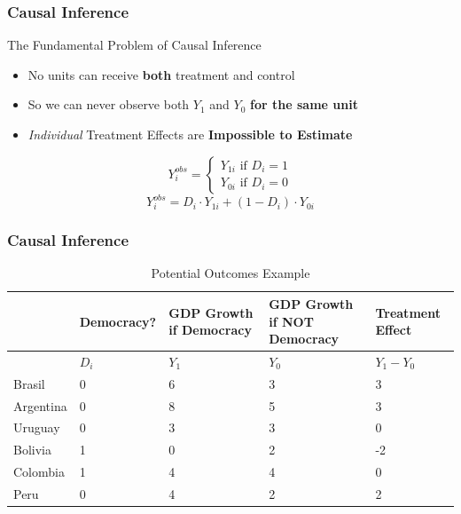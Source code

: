 \documentclass[xcolor=x11names,compress]{beamer}\usepackage[]{graphicx}\usepackage[]{color}
\renewcommand{\(}{\begin{columns}}
\renewcommand{\)}{\end{columns}}
\newcommand{\<}[1]{\begin{column}{#1}}
\renewcommand{\>}{\end{column}}
\begin{document}
\begin{frame}
\frametitle{Causal Inference}
\begin{block}{The Fundamental Problem of Causal Inference}
\begin{itemize}
\item No units can receive \textbf{both} treatment and control
\pause
\item So we can never observe both $Y_1$ and $Y_0$ \textbf{for the same unit}
\pause
\item \textit{Individual} Treatment Effects are \textbf{Impossible to Estimate}
\end{itemize}
\end{block}
\pause
\[
Y_{i}^{obs} = 
\begin{cases}
Y_{1i} \text{ if } D_i=1 \\
Y_{0i} \text{ if } D_i=0
\end{cases}
\]
\pause
$$Y_{i}^{obs} = D_i \cdot Y_{1i} + (1-D_i) \cdot Y_{0i}$$
\end{frame}

\begin{frame}
\frametitle{Causal Inference}
\footnotesize
\begin{table}[htbp]
  \centering
  \caption{Potential Outcomes Example}
    \begin{tabular}{|p{1.8cm}|p{1.8cm}|p{2cm}|p{2cm}|p{2cm}|}
    \hline
          & \multicolumn{1}{p{1.8cm}|}{Democracy?} & \multicolumn{1}{p{2cm}|}{GDP Growth if Democracy} & \multicolumn{1}{p{2.2cm}|}{GDP Growth if NOT Democracy} & \textbf{Treatment Effect} \bigstrut\\
    \hline
          & \multicolumn{1}{p{1.8cm}|}{$D_i$} & \multicolumn{1}{p{2cm}|}{$Y_1$} & \multicolumn{1}{p{2.2cm}|}{$Y_0$} & \multicolumn{1}{p{1.8cm}|}{$Y_{1} - Y_{0}$} \bigstrut\\
    \hline
    Brasil & 0 & 6     & 3     & 3 \bigstrut\\
    \hline
    Argentina & 0 & 8    & 5     & 3 \bigstrut\\
    \hline
    Uruguay & 0 & 3 & 3 & 0  \bigstrut\\
    \hline
    Bolivia & 1 & 0     & 2     & -2 \bigstrut\\
    \hline
    Colombia & 1 & 4    & 4    & 0 \bigstrut\\
    \hline
    Peru & 0 & 4     & 2     & 2 \bigstrut\\
    \hline
    \end{tabular}%
  \label{tab:addlabel}%
\end{table}%
\normalsize
\end{frame}
\end{document}
